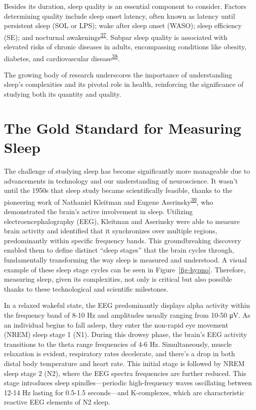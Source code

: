\documentclass[
  10pt,
]{scrbook}
\begin{document}
Besides its duration, sleep quality is an essential component to
consider. Factors determining quality include sleep onset latency, often
known as latency until persistent sleep (SOL or LPS); wake after sleep
onset (WASO); sleep efficiency (SE); and nocturnal
awakenings\textsuperscript{\protect\hyperlink{ref-buysse_2014}{37}}.
Subpar sleep quality is associated with elevated risks of chronic
diseases in adults, encompassing conditions like obesity, diabetes, and
cardiovascular
disease\textsuperscript{\protect\hyperlink{ref-basnet_2016}{38}}.

The growing body of research underscores the importance of understanding
sleep's complexities and its pivotal role in health, reinforcing the
significance of studying both its quantity and quality.

\hypertarget{the-gold-standard-for-measuring-sleep}{%
\section{The Gold Standard for Measuring
Sleep}\label{the-gold-standard-for-measuring-sleep}}

The challenge of studying sleep has become significantly more manageable
due to advancements in technology and our understanding of neuroscience.
It wasn't until the 1950s that sleep study became scientifically
feasible, thanks to the pioneering work of Nathaniel Kleitman and Eugene
Aserinsky\textsuperscript{\protect\hyperlink{ref-aserinsky_1953}{39}},
who demonstrated the brain's active involvement in sleep. Utilizing
electroencephalography (EEG), Kleitman and Aserinsky were able to
measure brain activity and identified that it synchronizes over multiple
regions, predominantly within specific frequency bands. This
groundbreaking discovery enabled them to define distinct ``sleep
stages'' that the brain cycles through, fundamentally transforming the
way sleep is measured and understood. A visual example of these sleep
stage cycles can be seen in Figure~\ref{fig-hypno}. Therefore, measuring
sleep, given its complexities, not only is critical but also possible
thanks to these technological and scientific milestones.

In a relaxed wakeful state, the EEG predominantly displays alpha
activity within the frequency band of 8-10 Hz and amplitudes usually
ranging from 10-50 \si{\micro\volt}. As an individual begins to fall
asleep, they enter the non-rapid eye movement (NREM) sleep stage 1 (N1).
During this drowsy phase, the brain's EEG activity transitions to the
theta range frequencies of 4-6 Hz. Simultaneously, muscle relaxation is
evident, respiratory rates decelerate, and there's a drop in both distal
body temperature and heart rate. This initial stage is followed by NREM
sleep stage 2 (N2), where the EEG spectra frequencies are further
reduced. This stage introduces sleep spindles---periodic high-frequency
waves oscillating between 12-14 Hz lasting for 0.5-1.5 seconds---and
K-complexes, which are characteristic reactive EEG elements of N2 sleep.
\end{document}
